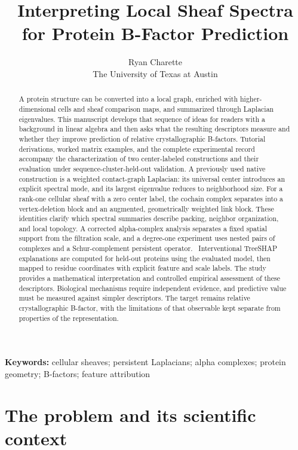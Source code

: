 \documentclass[11pt]{article}
\title{\color{ink}\bfseries Interpreting Local Sheaf Spectra for Protein B-Factor Prediction}
\author{Ryan Charette\\\small The University of Texas at Austin}
\date{}
\begin{document}
\maketitle
\begin{abstract}
A protein structure can be converted into a local graph, enriched with higher-dimensional cells and sheaf comparison maps, and summarized through Laplacian eigenvalues. This manuscript develops that sequence of ideas for readers with a background in linear algebra and then asks what the resulting descriptors measure and whether they improve prediction of relative crystallographic B-factors. Tutorial derivations, worked matrix examples, and the complete experimental record accompany the characterization of two center-labeled constructions and their evaluation under sequence-cluster-held-out validation. A previously used native construction is a weighted contact-graph Laplacian: its universal center introduces an explicit spectral mode, and its largest eigenvalue reduces to neighborhood size. For a rank-one cellular sheaf with a zero center label, the cochain complex separates into a vertex-deletion block and an augmented, geometrically weighted link block. These identities clarify which spectral summaries describe packing, neighbor organization, and local topology. A corrected alpha-complex analysis separates a fixed spatial support from the filtration scale, and a degree-one experiment uses nested pairs of complexes and a Schur-complement persistent operator. \AbstractEmpiricalResults\ Interventional TreeSHAP explanations are computed for held-out proteins using the evaluated model, then mapped to residue coordinates with explicit feature and scale labels. The study provides a mathematical interpretation and controlled empirical assessment of these descriptors. Biological mechanisms require independent evidence, and predictive value must be measured against simpler descriptors. The target remains relative crystallographic B-factor, with the limitations of that observable kept separate from properties of the representation.
\end{abstract}
\vspace{3pt}
\noindent\textbf{Keywords:} cellular sheaves; persistent Laplacians; alpha complexes; protein geometry; B-factors; feature attribution

\clearpage\tableofcontents\clearpage

\clearpage\part{The problem and its scientific context}
\end{document}
